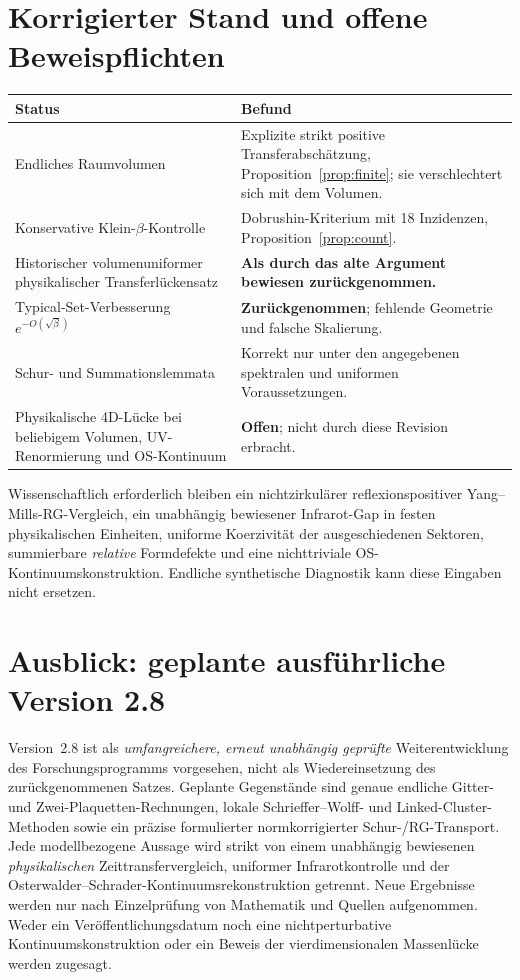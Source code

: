 \documentclass[11pt,a4paper]{article}
\theoremstyle{remark}
\begin{document}
\section{Korrigierter Stand und offene Beweispflichten}
\begin{center}\small
\begin{tabularx}{\textwidth}{@{}p{}Y@{}}
\toprule
Status & Befund\\
\midrule
Endliches Raumvolumen &
Explizite strikt positive Transferabschätzung,
Proposition~\ref{prop:finite}; sie verschlechtert
sich mit dem Volumen.\\
Konservative Klein-$\beta$-Kontrolle &
Dobrushin-Kriterium mit 18 Inzidenzen,
Proposition~\ref{prop:count}.\\
Historischer volumenuniformer
physikalischer Transferlückensatz &
\textbf{Als durch das alte Argument bewiesen zurückgenommen.}\\
Typical-Set-Verbesserung $e^{-O(\sqrt\beta)}$ &
\textbf{Zurückgenommen}; fehlende Geometrie
und falsche Skalierung.\\
Schur- und Summationslemmata &
Korrekt nur unter den angegebenen spektralen
und uniformen Voraussetzungen.\\
Physikalische 4D-Lücke bei beliebigem
Volumen, UV-Renormierung und OS-Kontinuum &
\textbf{Offen}; nicht durch diese Revision erbracht.\\
\bottomrule
\end{tabularx}
\end{center}
Wissenschaftlich erforderlich bleiben
ein nichtzirkulärer reflexionspositiver
Yang--Mills-RG-Vergleich, ein unabhängig
bewiesener Infrarot-Gap in festen
physikalischen Einheiten,
uniforme Koerzivität der
ausgeschiedenen Sektoren,
summierbare \emph{relative}
Formdefekte und eine
nichttriviale OS-Kontinuumskonstruktion.
Endliche synthetische Diagnostik
kann diese Eingaben nicht ersetzen.

\section{Ausblick: geplante ausführliche Version 2.8}
Version~2.8 ist als \emph{umfangreichere, erneut unabhängig geprüfte}
Weiterentwicklung des Forschungsprogramms vorgesehen, nicht als
Wiedereinsetzung des zurückgenommenen Satzes. Geplante Gegenstände
sind genaue endliche Gitter- und Zwei-Plaquetten-Rechnungen,
lokale Schrieffer--Wolff- und Linked-Cluster-Methoden sowie ein
präzise formulierter normkorrigierter Schur-/RG-Transport.
Jede modellbezogene Aussage wird strikt von einem unabhängig
bewiesenen \emph{physikalischen} Zeittransfervergleich,
uniformer Infrarotkontrolle und der
Osterwalder--Schrader-Kontinuumsrekonstruktion getrennt.
Neue Ergebnisse werden nur nach Einzelprüfung von Mathematik
und Quellen aufgenommen. Weder ein Veröffentlichungsdatum
noch eine nichtperturbative Kontinuumskonstruktion oder
ein Beweis der vierdimensionalen Massenlücke werden zugesagt.
\end{document}
